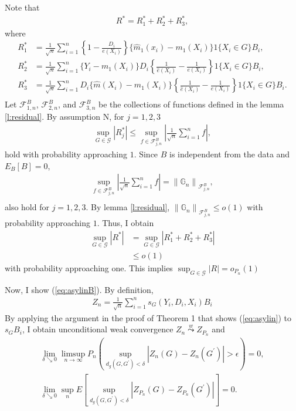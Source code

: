 \documentclass[12pt,oneside,reqno,english]{amsart}
\theoremstyle{definition}
\begin{document}
Note that 
\begin{align*}
R^{*}= R_{1}^{*}+R_{2}^{*}+R_{3}^{*},
\end{align*}
where 
\begin{align*}
 R_{1}^{*}&=\frac{1}{\sqrt{n}}\sum_{i=1}^{n}\left\{1-\frac{D_{i}}{e(X_{i})}\right\}\{\hat{m}_{1}(x_{i})-m_{1}(X_{i})\}1\{X_{i}\in G\}B_{i},\\
 R_{2}^{*}&=\frac{1}{\sqrt{n}}\sum_{i=1}^{n}\{Y_{i}-m_{1}(X_{i})\}D_{i}\left\{\frac{1}{\hat{e}(X_{i})}-\frac{1}{e(X_{i})}\right\}1\{X_{i}\in G\}B_{i},\\
 R_{3}^{*}&=\frac{1}{\sqrt{n}}\sum_{i=1}^{n}D_{i}\{\hat{m}(X_{i})-m_{1}(X_{i})\}\left\{\frac{1}{\hat{e}(X_{i})}-\frac{1}{e(X_{i})}\right\}1\{X_{i}\in G\}B_{i}.\\
\end{align*}
Let $\mathcal{F}_{1,n}^{B}$, $\mathcal{F}_{2,n}^{B}$, and $\mathcal{F}_{3,n}^{B}$ be the collections of functions defined in the lemma \ref{l:residual}. 
By assumption N, for $j=1,2,3$
\begin{align*}
\sup_{G\in \mathcal{G}}|R_{j}^{*}|\leq \sup_{f\in \mathcal{F}_{j,n}^{B}}\left|\frac{1}{\sqrt{n}}\sum_{i=1}^{n}f\right|,
\end{align*}
hold with probability approaching $1$. Since $B$ is independent from the data and $E_{B}[B]=0$,
\begin{align*}
 \sup_{f\in \mathcal{F}_{j,n}^{B}}\left|\frac{1}{\sqrt{n}}\sum_{i=1}^{n}f\right|=\left\|\mathbb{G}_{n}\right\|_{\mathcal{F}_{j,n}^{B}},\\
\end{align*}
also hold for $j=1,2,3$. By lemma \ref{l:residual}, 
$\left\|\mathbb{G}_{n}\right\|_{\mathcal{F}_{j,n}^{B}}\leq o(1)$ with probability approaching $1$. 
Thus, I obtain   
\begin{align*}
\sup_{G\in \mathcal{G}}|R^{*}|&=\sup_{G\in \mathcal{G}}|R^{*}_{1}+R^{*}_{2}+R^{*}_{3}|\\
&\leq o(1)
\end{align*}
with probability approaching one. This implies $\sup_{G\in \mathcal{G}}|R|=o_{P_{n}}(1)$

Now, I show (\ref{eq:asylinB}).  
By definition, 
\begin{align*}
Z_{n}=\frac{1}{\sqrt{n}}\sum_{i=1}^{n}s_{G}(Y_{i},D_{i},X_{i})B_{i}
\end{align*}
By applying the argument in the proof of Theorem 1 that shows (\ref{eq:asylin}) to $s_{G}B_{i}$, I obtain  
unconditional weak convergence $Z_{n}\overset{w}{\underset{}{\leadsto}}Z_{P_{n}}$
and 
\begin{align*}
\lim_{\delta\searrow 0}\limsup_{n\rightarrow \infty}P_{n}(\sup_{d_{g}(G,G^{\prime})<\delta}|Z_{n}(G)-Z_{n}(G^{\prime})|>\epsilon )=0,\\
\lim_{\delta\searrow 0}\sup_{n}E[\sup_{d_{g}(G,G^{\prime})<\delta}|Z_{P_{n}}(G)-Z_{P_{n}}(G^{\prime})|]=0.
\end{align*}
\end{document}
